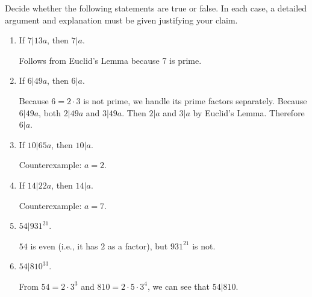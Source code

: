 \documentclass[nooutcomes]{ximera}
\begin{document}
\begin{problem}
Decide whether the following statements are true or false. In
  each case, a detailed argument and explanation must be given
  justifying your claim.
\begin{enumerate}
\item If $7|13a$, then $7|a$.  
  \begin{hint}Follows from Euclid's Lemma because 7 is prime.\end{hint}
\item If $6|49a$, then $6|a$.  
  \begin{hint}Because $6=2\cdot3$ is not prime, we handle its prime factors separately.  
  Because $6|49a$, both $2|49a$ and $3|49a$.  
  Then $2|a$ and $3|a$ by Euclid's Lemma. Therefore $6|a$.\end{hint}
\item If $10|65a$, then $10|a$. 
  \begin{hint}Counterexample: $a=2$.\end{hint}
\item If $14|22a$, then $14|a$.  
 \begin{hint}Counterexample: $a=7$.\end{hint}
\item $54|931^{21}$.  
 \begin{hint}$54$ is even (i.e., it has $2$ as a factor), but $931^{21}$ is not.\end{hint}
\item $54|810^{33}$.  
 \begin{hint}From $54 = 2\cdot3^3$ and $810 = 2\cdot 5\cdot 3^4$, 
 we can see that $54|810$.\end{hint}
\end{enumerate}
\end{problem}
\end{document}

